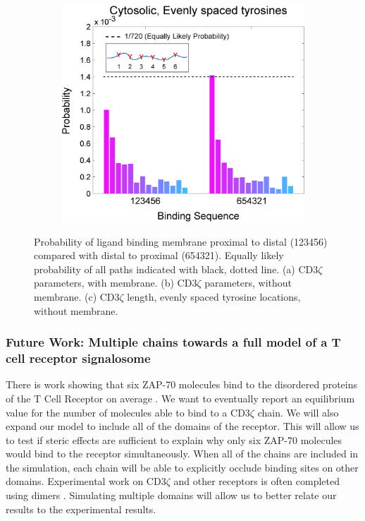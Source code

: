 \documentclass[../../AdvancementSummary.tex]{subfiles}
\begin{document}
\begin{figure}[H]
\begin{center}
\begin{subfigure}{0.3\linewidth}
			\caption{}
		\end{subfigure}
		\begin{subfigure}{0.3\linewidth}
			\includegraphics[width=\linewidth]{ResultsFigures/MultipleSequentialBinding/EvenSites/ProbVSSequence.eps}
			\caption{}
		\end{subfigure}
	\end{center}
	\caption{Probability of ligand binding membrane proximal to distal (123456) compared with distal to proximal (654321). Equally likely probability of all paths indicated with black, dotted line. (a) CD3$\zeta$ parameters, with membrane. (b) CD3$\zeta$ parameters, without membrane. (c) CD3$\zeta$ length, evenly spaced tyrosine locations, without membrane.}
\end{figure}

\subsubsection{Future Work: Multiple chains towards a full model of a T cell receptor signalosome}

There is work showing that six ZAP-70 molecules bind to the disordered proteins of the T Cell Receptor on average \cite{ODonoghue2013}. We want to eventually report an equilibrium value for the number of molecules able to bind to a CD3$\zeta$ chain. We will also expand our model to include all of the domains of the receptor. This will allow us to test if steric effects are sufficient to explain why only six ZAP-70 molecules would bind to the receptor simultaneously. When all of the chains are included in the simulation, each chain will be able to explicitly occlude binding sites on other domains. Experimental work on CD3$\zeta$ and other receptors is often completed using dimers \cite{Mukhopadhyay2016, Dobbins2016}. Simulating multiple domains will allow us to better relate our results to the experimental results. 
\end{document}

